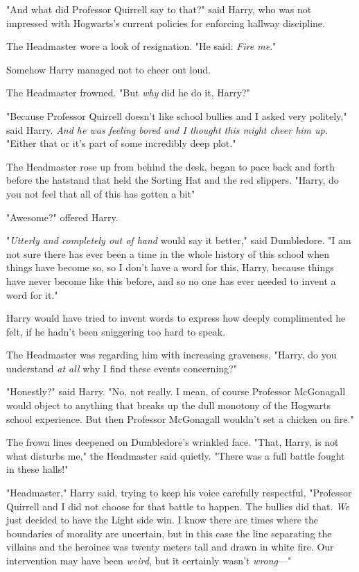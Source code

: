 "And what did Professor Quirrell say to that?" said Harry, who was not
impressed with Hogwarts's current policies for enforcing hallway discipline.

The Headmaster wore a look of resignation. "He said: \emph{Fire me}."

Somehow Harry managed not to cheer out loud.

The Headmaster frowned. "But \emph{why} did he do it, Harry?"

"Because Professor Quirrell doesn't like school bullies and I asked very
politely," said Harry. \emph{And he was feeling bored and I thought this might
cheer him up.} "Either that or it's part of some incredibly deep plot."

The Headmaster rose up from behind the desk, began to pace back and forth
before the hatstand that held the Sorting Hat and the red slippers. "Harry, do
you not feel that all of this has gotten a bit{\el}"

"Awesome?" offered Harry.

"\emph{Utterly and completely out of hand} would say it better," said
Dumbledore. "I am not sure there has ever been a time in the whole history of
this school when things have become so, so{\el} I don't have a word for
this, Harry, because things have never become like this before, and so no one
has ever needed to invent a word for it."

Harry would have tried to invent words to express how deeply complimented he
felt, if he hadn't been sniggering too hard to speak.

The Headmaster was regarding him with increasing graveness. "Harry, do you
understand \emph{at all} why I find these events concerning?"

"Honestly?" said Harry. "No, not really. I mean, of course Professor McGonagall
would object to anything that breaks up the dull monotony of the Hogwarts
school experience. But then Professor McGonagall wouldn't set a chicken on
fire."

The frown lines deepened on Dumbledore's wrinkled face. "That, Harry, is not
what disturbs me," the Headmaster said quietly. "There was a full battle fought
in these halls!"

"Headmaster," Harry said, trying to keep his voice carefully respectful,
"Professor Quirrell and I did not choose for that battle to happen. The bullies
did that. \emph{We} just decided to have the Light side win. I know there are
times where the boundaries of morality are uncertain, but in this case the line
separating the villains and the heroines was twenty meters tall and drawn in
white fire. Our intervention may have been \emph{weird}, but it certainly
wasn't \emph{wrong}---"

